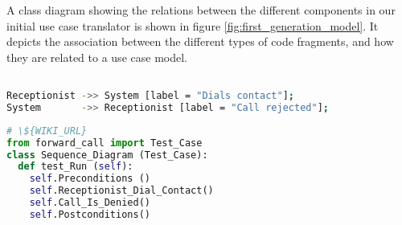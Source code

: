 \noindent
A class diagram showing the relations between the different components in our initial use case translator is shown in figure \ref{fig:first_generation_model}. It depicts the association between the different types of code fragments, and how they are related to a use case model.
\begin{lstlisting}[language=Bash, caption=Example seqdiag input fragment, label=lst:seqdiag_code_example]

Receptionist ->> System [label = "Dials contact"];
System       ->> Receptionist [label = "Call rejected"];
\end{lstlisting}

\begin{lstlisting}[language=Python, caption=Example generated Python code output, label=lst:example_python_output]
# \${WIKI_URL}
from forward_call import Test_Case
class Sequence_Diagram (Test_Case):
  def test_Run (self):
    self.Preconditions ()
    self.Receptionist_Dial_Contact()
    self.Call_Is_Denied()
    self.Postconditions()

\end{lstlisting}

